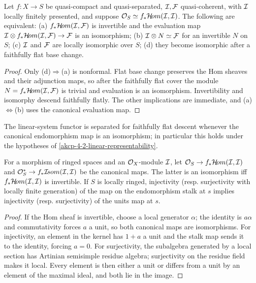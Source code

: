 \begin{lemma}
\label{akcp-4-3-twist-descent}
Let $f:X\to S$ be quasi-compact and quasi-separated, $\mathcal I,\mathcal F$ quasi-coherent,
with $\mathcal I$ locally finitely presented, and suppose
$\mathcal O_S\simeq f_*\mathcal H\!om(\mathcal I,\mathcal I)$.  The following are equivalent:
 (a) $f_*\mathcal H\!om(\mathcal I,\mathcal F)$ is invertible and the evaluation map
$\mathcal I\otimes f_*\mathcal H\!om(\mathcal I,\mathcal F)\to\mathcal F$ is an isomorphism;
 (b) $\mathcal I\otimes N\simeq\mathcal F$ for an invertible $N$ on $S$;
 (c) $\mathcal I$ and $\mathcal F$ are locally isomorphic over $S$;
 (d) they become isomorphic after a faithfully flat base change.
\end{lemma}
\begin{proof}
Only (d)$\Rightarrow$(a) is nonformal.  Flat base change preserves the Hom
sheaves and their adjunction maps, so after the faithfully flat cover the module
$N=f_*\mathcal H\!om(\mathcal I,\mathcal F)$ is trivial and evaluation is an isomorphism.
Invertibility and isomorphy descend faithfully flatly.  The other implications
are immediate, and (a)$\Leftrightarrow$(b) uses the canonical evaluation map.
\end{proof}

\begin{remark}[Separatedness]
\label{akcp-4-4-separatedness}
The linear-system functor is separated for faithfully flat descent whenever the
canonical endomorphism map is an isomorphism; in particular this holds under
the hypotheses of \cref{akcp-4-2-linear-representability}.
\end{remark}

\begin{lemma}
\label{akcp-4-5-endomorphism-map}
For a morphism of ringed spaces and an $\mathcal O_X$-module $\mathcal I$, let
$\mathcal O_S\to f_*\mathcal H\!om(\mathcal I,\mathcal I)$ and
$\mathcal O_S^*\to f_*\mathcal I\!som(\mathcal I,\mathcal I)$ be the canonical maps.  The latter
is an isomorphism iff $f_*\mathcal H\!om(\mathcal I,\mathcal I)$ is invertible.  If $S$ is
locally ringed, injectivity (resp. surjectivity with locally finite generation)
of the map on the endomorphism stalk at $s$ implies injectivity (resp.
surjectivity) of the units map at $s$.
\end{lemma}
\begin{proof}
If the Hom sheaf is invertible, choose a local generator $\alpha$; the identity
is $a\alpha$ and commutativity forces $a$ a unit, so both canonical maps are
isomorphisms.  For injectivity, an element in the kernel has $1+a$ a unit and
the stalk map sends it to the identity, forcing $a=0$.  For surjectivity, the
subalgebra generated by a local section has Artinian semisimple residue algebra;
surjectivity on the residue field makes it local.  Every element is then either
a unit or differs from a unit by an element of the maximal ideal, and both lie
in the image.
\end{proof}
